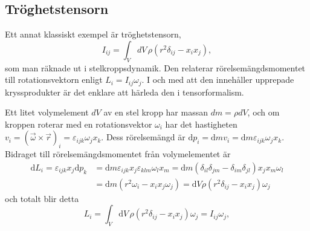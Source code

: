 \documentclass[%
oneside,                 %
final,                   %
10pt]{article}
\begin{document}
\subsection{Tröghetstensorn}
Ett annat klassiskt exempel är tröghetstensorn,  
\begin{equation}
I_{ij}=\int_VdV\,\rho(r^2\delta_{ij}-x_ix_j),
\end{equation}
som man räknade ut i stelkroppsdynamik. Den relaterar rörelsemängdsmomentet till
rotationsvektorn enligt $L_i=I_{ij}\omega_j$. I och med att den innehåller upprepade
kryssprodukter är det enklare att härleda den i tensorformalism. 

Ett litet volymelement $dV$ av en stel kropp har massan $dm=\rho dV$,
och om kroppen roterar med en rotationsvektor $\omega_i$ har
det hastigheten $v_i=(\vec\omega\times\vec{r})_i=\varepsilon_{ijk}\omega_jx_k$. 
Dess rörelsemängd är $\mbox{d}p_i=\mbox{d}mv_i=\mbox{d}m\varepsilon_{ijk}\omega_jx_k$. Bidraget till rörelsemängdsmomentet från volymelementet är 
\begin{align}
\mbox{d}L_i = \varepsilon_{ijk}x_j \mbox{d}p_k &= \mbox{d}m\varepsilon_{ijk}x_j\varepsilon_{klm}\omega_lx_m
=\mbox{d}m(\delta_{il}\delta_{jm}-\delta_{im}\delta_{jl})x_jx_m\omega_l \nonumber \\
&=\mbox{d}m(r^2\omega_i-x_ix_j\omega_j)=\mbox{d}V\rho(r^2\delta_{ij}-x_ix_j)\omega_j
\end{align}
och totalt blir detta
\begin{equation}
L_i = \int_V \mbox{d}V\,\rho(r^2\delta_{ij}-x_ix_j) \omega_j = I_{ij} \omega_j,
\end{equation}




\printindex
\end{document}
